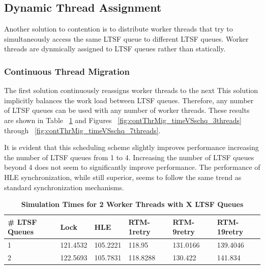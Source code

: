 \documentclass[11pt]{book}
\begin{document}
\subsection{Dynamic Thread Assignment}

Another solution to contention is to distribute worker threads that try to
simultaneously access the same LTSF queue to different LTSF queues.  Worker
threads are dynmically assigned to LTSF queues rather than statically.  

\subsubsection{Continuous Thread Migration}

The first solution continuously reassigns worker threads to the next  
This solution implicitly balances the work load between LTSF queues.  Therefore,
any number of LTSF queues can be used with any number of worker threads.  These
results are shown in Table ~\ref{tab:contThrMig_2threadsXschq} and Figures
~\ref{fig:contThrMig_timeVSschq_3threads} through
~\ref{fig:contThrMig_timeVSschq_7threads}. 

It is evident that this scheduling scheme slightly improves performance
increasing the number of LTSF queues from 1 to 4.  Increasing the number of LTSF
queues beyond 4 does not seem to significantly improve performance.  The
performance of HLE synchronization, while still superior, seems to follow the
same trend as standard synchronization mechanisms.

\begin{table}[H]
    \centering
    \begin{tabular}{l|p{2cm}|p{2cm}|p{2cm}|p{2cm}|p{2cm}}
        \textbf{\# LTSF Queues}&Lock &HLE &RTM-1retry &RTM-9retry &RTM-19retry \\
        \hline
        \midrule
            1 &121.4532  &105.2221 &118.95   &131.0166 &139.4046 \\ 
            2 &122.5693  &105.7831 &118.8288 &130.422  &141.834  \\
    \end{tabular}
    \caption{\textbf{Simulation Times for 2 Worker Threads with X LTSF
        Queues}}\label{tab:contThrMig_2threadsXschq}
\end{table}
\end{document}
